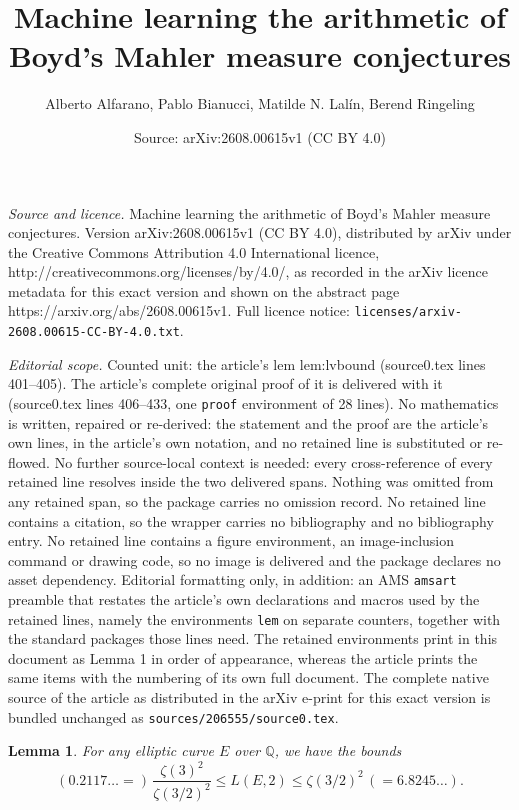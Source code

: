 \documentclass[10pt,a4paper]{amsart}
\title{Machine learning the arithmetic of Boyd's Mahler measure conjectures}
\author{Alberto Alfarano, Pablo Bianucci, Matilde N. Lal\'in, Berend Ringeling}
\date{Source: arXiv:2608.00615v1 (CC BY 4.0)}
\newtheorem{lem}{Lemma}
\newcommand{\Q}{\mathbb{Q}}
\begin{document}
\maketitle

\noindent\emph{Source and licence.} Machine learning the arithmetic of Boyd's Mahler measure conjectures. Version arXiv:2608.00615v1 (CC BY 4.0), distributed by arXiv under the Creative Commons Attribution 4.0 International licence, http://creativecommons.org/licenses/by/4.0/, as recorded in the arXiv licence metadata for this exact version and shown on the abstract page https://arxiv.org/abs/2608.00615v1. Full licence notice: \texttt{licenses/arxiv-2608.00615-CC-BY-4.0.txt}.\par\smallskip

\noindent\textit{Editorial scope.} Counted unit: the article's lem lem:lvbound (source0.tex lines 401--405). The article's complete original proof of it is delivered with it (source0.tex lines 406--433, one \texttt{proof} environment of 28 lines). No mathematics is written, repaired or re-derived: the statement and the proof are the article's own lines, in the article's own notation, and no retained line is substituted or re-flowed.  No further source-local context is needed: every cross-reference of every retained line resolves inside the two delivered spans.  Nothing was omitted from any retained span, so the package carries no omission record.  No retained line contains a citation, so the wrapper carries no bibliography and no bibliography entry.  No retained line contains a figure environment, an image-inclusion command or drawing code, so no image is delivered and the package declares no asset dependency.  Editorial formatting only, in addition: an AMS \texttt{amsart} preamble that restates the article's own declarations and macros used by the retained lines, namely the environments \texttt{lem} on separate counters, together with the standard packages those lines need.  The retained environments print in this document as Lemma 1 in order of appearance, whereas the article prints the same items with the numbering of its own full document.  The complete native source of the article as distributed in the arXiv e-print for this exact version is bundled unchanged as \texttt{sources/206555/source0.tex}.
\begin{lem}
\label{lem:lvbound}
For any elliptic curve $E$ over $\Q$, we have the bounds
    \[ (0.2117\ldots =) \, \frac{\zeta(3)^2}{\zeta(3/2)^2} \leq L(E,2) \leq \zeta(3/2)^2 \, (= 6.8245\ldots).\]
\end{lem}
\end{document}
